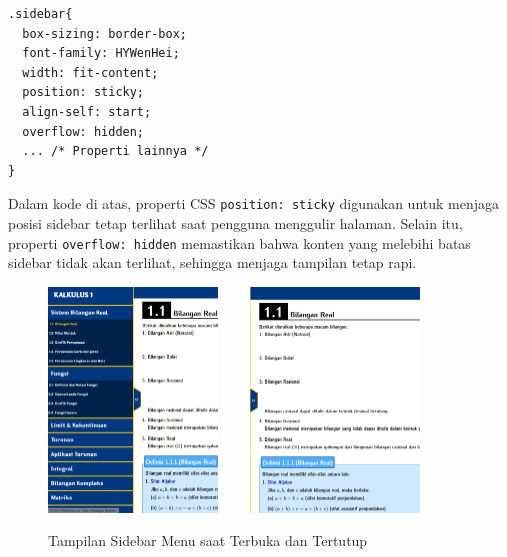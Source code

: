 \documentclass{file/KP-ITS}
\theoremstyle{definition}
\theoremstyle{definition}
\theoremstyle{plain}
\begin{document}
\begin{verbatim}
.sidebar{
  box-sizing: border-box;
  font-family: HYWenHei;
  width: fit-content;
  position: sticky;
  align-self: start;
  overflow: hidden;
  ... /* Properti lainnya */
}
\end{verbatim}
Dalam kode di atas, properti CSS \texttt{position: sticky} digunakan untuk menjaga posisi sidebar tetap terlihat saat pengguna menggulir halaman. Selain itu, properti \texttt{overflow: hidden} memastikan bahwa konten yang melebihi batas sidebar tidak akan terlihat, sehingga menjaga tampilan tetap rapi.
\begin{figure}[h!]
    \centering
    \includegraphics[width=0.4\textwidth]{foto/SidebarBuka.png}$\qquad$
    \includegraphics[width=0.4\textwidth]{foto/SidebarTutup.png}
    \caption{Tampilan Sidebar Menu saat Terbuka dan Tertutup}
\end{figure}
\end{document}
